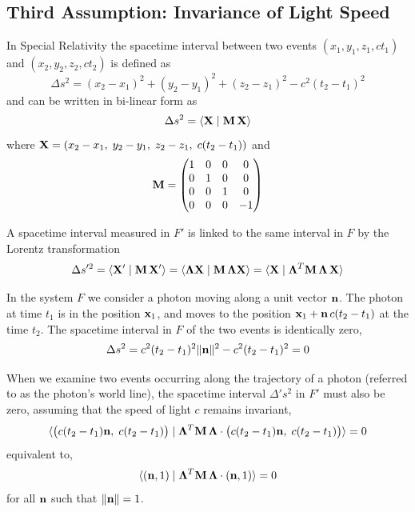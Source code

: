 \documentclass[12pt]{article}
\newcommand{\ip}[2]{\langle #1 \mid #2 \rangle}
\begin{document}
\subsection{Third Assumption: Invariance of Light Speed}

In Special Relativity the spacetime interval between two events $(x_1, y_1, z_1, ct_1)$ and
$(x_2, y_2, z_2, ct_2)$ is defined as
\begin{equation}
  \Delta s^2 = (x_2 - x_1)^2 + (y_2 - y_1)^2 + (z_2 - z_1)^2 - c^2(t_2 - t_1)^2
\end{equation}
and can be written in bi-linear form as
\begin{equation}
  \Delta s^2 = \ip{\vb{X}}{\vb{M}\,\vb{X}}
\end{equation}
where $\vb{X} = (x_2 - x_1,\; y_2 - y_1,\; z_2 - z_1,\; c(t_2 - t_1))$ and
\begin{equation}
  \vb{M} =
  \begin{pmatrix}
    1 & 0 & 0 &  0 \\
    0 & 1 & 0 &  0 \\
    0 & 0 & 1 &  0 \\
    0 & 0 & 0 & -1
  \end{pmatrix}
\end{equation}

A spacetime interval measured in $F'$ is linked to the same interval in $F$ by the Lorentz
transformation
\begin{equation}
  \Delta s'^2
  = \ip{\vb{X}'}{\vb{M}\,\vb{X}'}
  = \ip{\boldsymbol{\Lambda}\vb{X}}{\vb{M}\,\boldsymbol{\Lambda}\vb{X}}
  = \ip{\vb{X}}{\boldsymbol{\Lambda}^T\vb{M}\,\boldsymbol{\Lambda}\,\vb{X}}
\end{equation}

In the system $F$ we consider a photon moving along a unit vector $\vb{n}$. The photon at
time $t_1$ is in the position $\vb{x}_1$, and moves to the position
$\vb{x}_1 + \vb{n}\,c(t_2 - t_1)$ at the time $t_2$. The spacetime interval in $F$ of the
two events is identically zero,
\begin{equation}
  \Delta s^2 = c^2(t_2 - t_1)^2\|\vb{n}\|^2 - c^2(t_2 - t_1)^2 = 0
\end{equation}

When we examine two events occurring along the trajectory of a photon (referred to as the
photon's world line), the spacetime interval $\Delta' s^2$ in $F'$ must also be zero, assuming
that the speed of light $c$ remains invariant,
\begin{equation}
  \ip{
    \bigl(c(t_2-t_1)\vb{n},\; c(t_2-t_1)\bigr)
  }{
    \boldsymbol{\Lambda}^T\vb{M}\,\boldsymbol{\Lambda}
    \cdot\bigl(c(t_2-t_1)\vb{n},\; c(t_2-t_1)\bigr)
  } = 0
\end{equation}
equivalent to,
\begin{equation}
  \ip{(\vb{n},1)}{\boldsymbol{\Lambda}^T\vb{M}\,\boldsymbol{\Lambda}\cdot(\vb{n},1)}
  = 0
  \label{eq:invariance_light_speed}
\end{equation}
for all $\vb{n}$ such that $\|\vb{n}\| = 1$.
\end{document}

